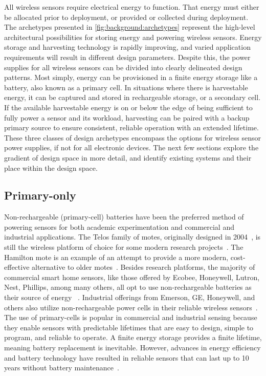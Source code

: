 All wireless sensors require electrical energy to function.
That energy must either be allocated prior to deployment, or provided or collected during deployment.
The archetypes presented in \cref{fig:background:archetypes} represent the high-level architectural possibilities for storing energy and powering wireless sensors.
Energy storage and harvesting technology is rapidly improving, and varied application requirements will result in different design parameters. Despite this, the power supplies for all wireless sensors can be divided into clearly delineated design patterns.
Most simply, energy can be provisioned in a finite energy storage like a battery, also known as a primary cell. In situations where there is harvestable energy, it can be captured and stored in rechargeable storage, or a secondary cell.
If the available harvestable energy is on or below the edge of being sufficient to fully power a sensor and its workload, harvesting can be paired with a backup primary source to ensure consistent, reliable operation with an extended lifetime.
These three classes of design archetypes encompass the options for wireless sensor power supplies, if not for all electronic devices.
The next few sections explore the gradient of design space in more detail, and identify existing systems and their place within the design space.

\subsection{Primary-only}
Non-rechargeable (primary-cell) batteries have been the preferred
method of powering sensors for both academic experimentation
and commercial and industrial applications.
The Telos family of motes, originally designed in 2004~\cite{polastre2005telos},
is still the wireless platform of choice for some modern research projects~\cite{mohammad2018codecast,li2019privacy}.
The Hamilton mote is an example of an attempt to provide a more modern, cost-effective alternative to older motes~\cite{andersen2017hamilton}.
Besides research platforms, the majority of commercial smart home sensors, like those offered by Ecobee, Honeywell, Lutron, Nest, Phillips, among many others, all opt to use non-rechargeable batteries as their source of energy
~\cite{ecobeeSensor, honeywellThermostat, lutronSolutions, googleNestTemperature, hueSensor}.
Industrial offerings from Emerson, GE, Honeywell, and others also utilize non-rechargeable power cells in their reliable wireless sensors~\cite{emersonRosemount,GEInsightMesh,honeywellOneWireless}.
The use of primary-cells is popular in commercial and industrial sensing because they enable sensors with predictable lifetimes that are easy to
design, simple to program, and reliable to operate.
A finite energy storage provides a finite lifetime, meaning battery replacement is inevitable. However, advances in energy efficiency and battery technology have resulted in reliable sensors that can last up to 10 years without battery maintenance~\cite{emersonRosemount,honeywellOneWireless, lutronSolutions}.

